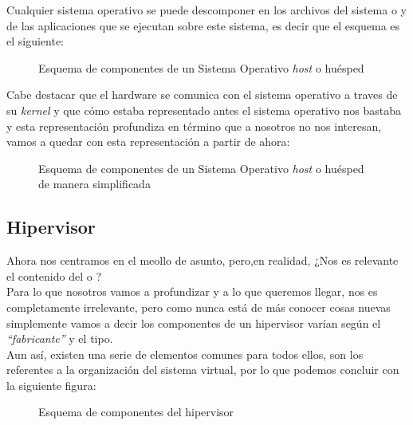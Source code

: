 Cualquier sistema operativo se puede descomponer en los archivos del sistema o \emph{} y de las aplicaciones que se ejecutan sobre este sistema, es decir que el esquema es el siguiente:

\begin{figure}[H]
\begin{center}
\end{center}
\caption[Sistema Operativo huésped]{Esquema de componentes de un Sistema Operativo \emph{host} o huésped}
\end{figure}

Cabe destacar que el hardware se comunica con el sistema operativo a traves de su \emph{kernel} y que cómo estaba representado antes el sistema operativo nos bastaba y esta representación profundiza en término que a nosotros no nos interesan, vamos a quedar con esta representación a partir de ahora:

\begin{figure}[H]
\begin{center}
\end{center}
\caption[Sistema Operativo huésped simplificado]{Esquema de componentes de un Sistema Operativo \emph{host} o huésped de manera simplificada}
\end{figure}

\subsection{Hipervisor}
Ahora nos centramos en el meollo de asunto, pero,en realidad, ¿Nos es relevante el contenido del  o ?\\

Para lo que nosotros vamos a profundizar y a lo que queremos llegar, nos es completamente irrelevante, pero como nunca está de más conocer cosas nuevas simplemente vamos a decir los componentes de un hipervisor varían según el \emph{\textquotedblleft fabricante\textquotedblright} y el tipo.\\

Aun así, existen una serie de elementos comunes para todos ellos, son los referentes a la organización del sistema virtual, por lo que podemos concluir con la siguiente figura:

\begin{figure}[H]
\begin{center}
\end{center}
\caption[Componentes hipervisor]{Esquema de componentes del hipervisor}
\end{figure}

